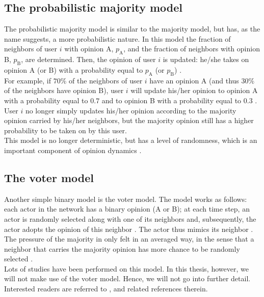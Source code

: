 \documentclass[11 pt , letterpaper , twoside , openright]{book}
\begin{document}
\subsection{The probabilistic majority model}\label{probMaj}

The probabilistic majority model is similar to the majority model, but has, as the name suggests, a more probabilistic nature. In this model the fraction of neighbors of user $i$ with opinion A, $p_\text{A}$, and the fraction of neighbors with opinion B, $p_\text{B}$, are determined. Then, the opinion of user $i$ is updated: he/she takes on opinion A (or B) with a probability equal to $p_\text{A}$ (or $p_\text{B}$) \cite{Perra2019}.\\
\newline
For example, if $70\%$ of the neighbors of user $i$ have an opinion A (and thus $30 \%$ of the neighbors have opinion B), user $i$ will update his/her opinion to opinion A with a probability equal to $0.7$ and to opinion B with a probability equal to $0.3$ \cite{Perra2019}. User $i$ no longer simply updates his/her opinion according to the majority opinion carried by his/her neighbors, but the majority opinion still has a higher probability to be taken on by this user.\\
\newline
This model is no longer deterministic, but has a level of randomness, which is an important component of opinion dynamics \cite{Perra2019}. 

\subsection{The voter model}

Another simple binary model is the voter model. The model works as follows: each actor in the network has a binary opinion (A or B); at each time step, an actor is randomly selected along with one of its neighbors and, subsequently, the actor adopts the opinion of this neighbor \cite{Castellano2009}. The actor thus mimics its neighbor \cite{Castellano2009}. \\
\newline
The pressure of the majority in only felt in an averaged way, in the sense that a neighbor that carries the majority opinion has more chance to be randomly selected \cite{Castellano2009}.\\
\newline
Lots of studies have been performed on this model. In this thesis, however, we will not make use of the voter model. Hence, we will not go into further detail. Interested readers are referred to \cite{Castellano2009}, \cite{Fernandez2014} and related references therein.
\end{document}
